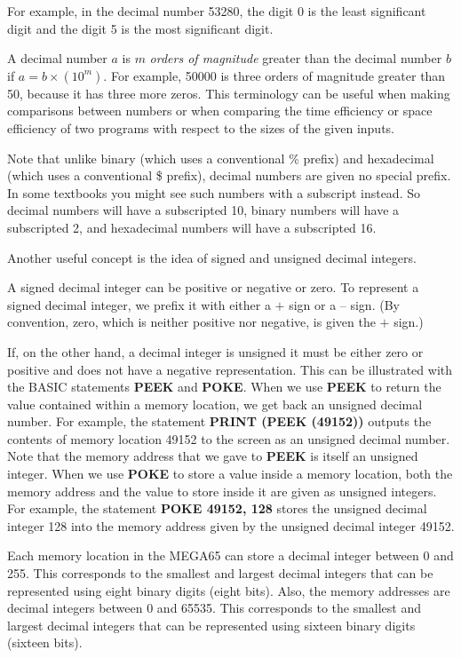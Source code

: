 For example, in the decimal number 53280, the digit 0 is the least significant digit and the digit 5 is the most significant digit.

A decimal number $a$ is $m$ {\it orders of magnitude} greater than the decimal number $b$ if $a = b \times (10^{m})$. For example, 50000 is three orders of magnitude greater than 50, because it has three more zeros. This terminology can be useful when making comparisons between numbers or when comparing the time efficiency or space efficiency of two programs with respect to the sizes of the given inputs.

Note that unlike binary (which uses a conventional \% prefix) and hexadecimal (which uses a conventional \$ prefix), decimal numbers are given no special prefix. In some textbooks you might see such numbers with a subscript instead. So decimal numbers will have a subscripted 10, binary numbers will have a subscripted 2, and hexadecimal numbers will have a subscripted 16.

Another useful concept is the idea of signed and unsigned decimal integers.

A signed decimal integer can be positive or negative or zero. To represent a signed decimal integer, we prefix it with either a $+$ sign or a $–$ sign. (By convention, zero, which is neither positive nor negative, is given the $+$ sign.)

If, on the other hand, a decimal integer is unsigned it must be either zero or positive and does not have a negative representation. This can be illustrated with the BASIC statements {\bf PEEK} and {\bf POKE}. When we use {\bf PEEK} to return the value contained within a memory location, we get back an unsigned decimal number. For example, the statement {\bf PRINT (PEEK (49152))} outputs the contents of memory location 49152 to the screen as an unsigned decimal number. Note that the memory address that we gave to {\bf PEEK} is itself an unsigned integer. When we use {\bf POKE} to store a value inside a memory location, both the memory address and the value to store inside it are given as unsigned integers. For example, the statement {\bf POKE 49152, 128} stores the unsigned decimal integer 128 into the memory address given by the unsigned decimal integer 49152.

Each memory location in the MEGA65 can store a decimal integer between 0 and 255. This corresponds to the smallest and largest decimal integers that can be represented using eight binary digits (eight bits). Also, the memory addresses are decimal integers between 0 and 65535. This corresponds to the smallest and largest decimal integers that can be represented using sixteen binary digits (sixteen bits).

